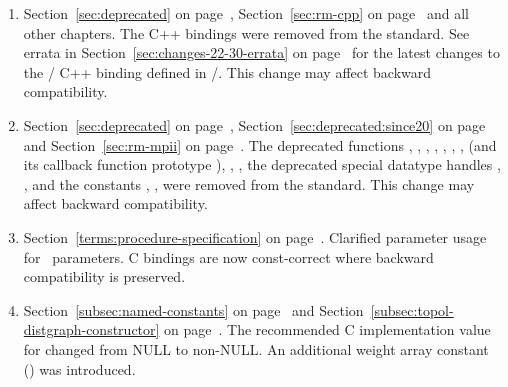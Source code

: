 \begin{enumerate}

\item 
Section~\ref{sec:deprecated} on page~\pageref{sec:deprecated},
Section~\ref{sec:rm-cpp} on page~\pageref{sec:rm-cpp} and all other chapters. 
\newline 
The C++ bindings were removed from the standard.
See errata 
in Section~\ref{sec:changes-22-30-errata} on page~\pageref{sec:changes-22-30-errata}
for the latest changes to the \MPI/ C++ binding defined in \MPIIIDOTII/. 
\newline This change may affect backward compatibility.

\item
{\raggedright
Section~\ref{sec:deprecated} on page~\pageref{sec:deprecated},
Section~\ref{sec:deprecated:since20} on page~\pageref{sec:deprecated:since20} and
Section~\ref{sec:rm-mpii} on page~\pageref{sec:rm-mpii}.
\newline 
The deprecated functions 
,
,
,
,
,
,
,
(and its callback function prototype ),
,
,
the deprecated special datatype handles
,
,
and the constants
,
,
were removed from the standard. 
\newline This change may affect backward compatibility.

}
\item 
Section~\ref{terms:procedure-specification} on page~\pageref{terms:procedure-specification}. 
\newline 
Clarified parameter usage for \IN\ parameters. C bindings are now const-correct where
backward compatibility is preserved. 

\item 
Section~\ref{subsec:named-constants} on page~\pageref{subsec:named-constants} and
Section~\ref{subsec:topol-distgraph-constructor} on page~\pageref{subsec:topol-distgraph-constructor}. 
\newline 
The recommended C implementation value for  
changed from NULL to non-NULL. 
An additional weight array constant () was introduced.


\end{enumerate}
